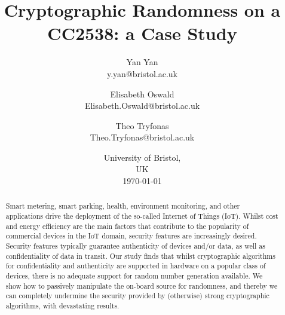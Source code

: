 \documentclass{article}
\title{Cryptographic Randomness on a CC2538: a Case Study}
\author{ 
Yan Yan \\ 
y.yan@bristol.ac.uk
\and
Elisabeth Oswald \\ 
Elisabeth.Oswald@bristol.ac.uk
\and
Theo Tryfonas \\ 
Theo.Tryfonas@bristol.ac.uk
}
\date{University of Bristol, \\ UK \\ \today}
\begin{document}
\maketitle

\begin{abstract}
Smart metering, smart parking, health, environment monitoring, and other applications drive the deployment of the so-called Internet of Things (IoT). Whilst cost and energy efficiency are the main factors that contribute to the popularity of commercial devices in the IoT domain, security features are increasingly desired. Security features typically guarantee authenticity of devices and/or data, as well as confidentiality of data in transit. Our study finds that whilst cryptographic algorithms for confidentiality and authenticity are supported in hardware on a popular class of devices, there is no adequate support for random number generation available. We show how to passively manipulate the on-board source for randomness, and thereby we can completely undermine the security provided by (otherwise) strong cryptographic algorithms, with devastating results. 
\end{abstract}










\appendix

\end{document}
